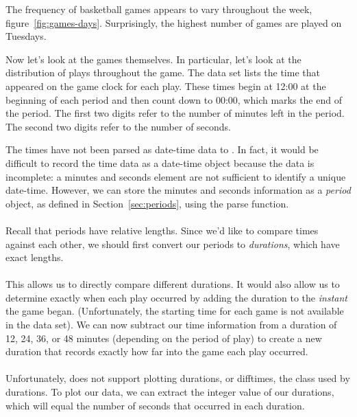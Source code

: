 \documentclass[article]{jss}
\begin{document}
The frequency of basketball games appears to vary throughout the week, figure~\ref{fig:games-days}. Surprisingly, the highest number of games are played on Tuesdays.

Now let's look at the games themselves. In particular, let's look at the distribution of plays throughout the game. The  data set lists the time that appeared on the game clock for each play. These times begin at 12:00 at the beginning of each period and then count down to 00:00, which marks the end of the period. The first two digits refer to the number of minutes left in the period. The second two digits refer to the number of seconds.

The times have not been parsed as date-time data to . In fact, it would be difficult to record the time data as a date-time object because the data is incomplete: a minutes and seconds element are not sufficient to identify a unique date-time. However, we can store the minutes and seconds information as a \emph{period} object, as defined in Section~\ref{sec:periods}, using the  parse function.\\

\\

Recall that periods have relative lengths. Since we'd like to compare times against each other, we should first convert our periods to \emph{durations}, which have exact lengths.\\

\\

This allows us to directly compare different durations. It would also allow us to determine exactly when each play occurred by adding the duration to the \emph{instant} the game began. (Unfortunately, the starting time for each game is not available in the data set). We can now subtract our time information from a duration of 12, 24, 36, or 48 minutes (depending on the period of play) to create a new duration that records exactly how far into the game each play occurred.\\

\\

Unfortunately,  does not support plotting durations, or difftimes, the class used by durations. To plot our data, we can extract the integer value of our durations, which will equal the number of seconds that occurred in each duration.\\
\end{document}
